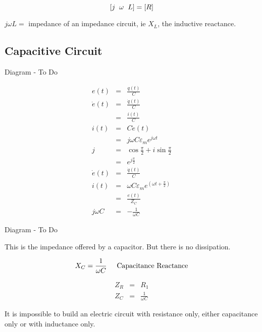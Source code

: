 \documentclass[a4paper,12pt]{article}
\begin{document}
\[ [j \hspace{2mm} \omega \hspace{2mm} L ] = [ R ] \]


$j \omega L = $ impedance of an impedance circuit, ie $X_{L}$, the
inductive reactance.

\subsection{Capacitive Circuit}

\begin{table}[hbtp]

Diagram - To Do

\end{table}

\begin{eqnarray*}
e(t)			& = & \frac{q(t)}{C} \\
\dot{e}(t)	& = & \frac{\dot{q}(t)}{C} \\
				& = & \frac{i(t)}{C} \\
i(t)			& = & C \dot{e}(t) \\
				& = & j \omega C \varepsilon_{m} e^{j \omega t} \\
j				& = & \cos{\frac{\pi}{2}} + i \sin{\frac{\pi}{2}} \\
				& = & e^{j \frac{\pi}{2}} \\
\dot{e}(t)	& = & \frac{\dot{q}(t)}{C} \\
i(t)			& = & \omega C \varepsilon_{m} e^{(\omega t +
\frac{\pi}{2})} \\
				& = & \frac{e(t)}{Z_{C}} \\
j \omega C	& = & - \frac{1}{\omega C}
\end{eqnarray*}

\begin{table}[hbtp]

Diagram - To Do

\end{table}

This is the impedance offered by a capacitor. But there is no
dissipation.

\[ X_{C} = \frac{1}{\omega C} \mbox{\hspace{5mm}Capacitance Reactance}
\]

\begin{eqnarray*}
Z_{R} & = & R_{1} \\
Z_{C} & = & \frac{1}{\omega C}
\end{eqnarray*}

It is impossible to build an electric circuit with resistance only, either
capacitance only or with inductance only.
\end{document}
